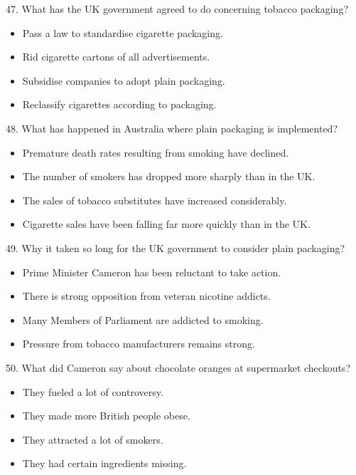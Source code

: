 \documentclass[UTF8,11pt]{ctexart}
\begin{document}
47. What has the UK government agreed to do concerning tobacco packaging?


\begin{itemize}[leftmargin=2em,itemsep=.2em,topsep=.4em]\item[A.] Pass a law to standardise cigarette packaging.
\item[B.] Rid cigarette cartons of all advertisements.
\item[C.] Subsidise companies to adopt plain packaging.
\item[D.] Reclassify cigarettes according to packaging.
\end{itemize}

48. What has happened in Australia where plain packaging is implemented?


\begin{itemize}[leftmargin=2em,itemsep=.2em,topsep=.4em]\item[A.] Premature death rates resulting from smoking have declined.
\item[B.] The number of smokers has dropped more sharply than in the UK.
\item[C.] The sales of tobacco substitutes have increased considerably.
\item[D.] Cigarette sales have been falling far more quickly than in the UK.
\end{itemize}

49. Why it taken so long for the UK government to consider plain packaging?


\begin{itemize}[leftmargin=2em,itemsep=.2em,topsep=.4em]\item[A.] Prime Minister Cameron has been reluctant to take action.
\item[B.] There is strong opposition from veteran nicotine addicts.
\item[C.] Many Members of Parliament are addicted to smoking.
\item[D.] Pressure from tobacco manufacturers remains strong.
\end{itemize}

50. What did Cameron say about chocolate oranges at supermarket checkouts?


\begin{itemize}[leftmargin=2em,itemsep=.2em,topsep=.4em]\item[A.] They fueled a lot of controversy.
\item[B.] They made more British people obese.
\item[C.] They attracted a lot of smokers.
\item[D.] They had certain ingredients missing.
\end{itemize}
\end{document}
